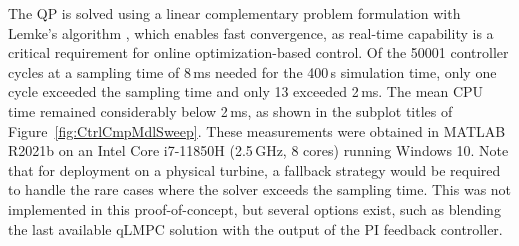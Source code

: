  The QP is solved using a linear complementary problem formulation with Lemke's algorithm \cite{cisneros2020velocity}, which enables fast convergence, as real-time capability is a critical requirement for online optimization-based control. Of the 50001 controller cycles at a sampling time of 8\,ms needed for the 400\,s simulation time, only one cycle exceeded the sampling time and only 13 exceeded 2\,ms. The mean CPU time remained considerably below 2\,ms, as shown in the subplot titles of Figure~\ref{fig:CtrlCmpMdlSweep}. These measurements were obtained in MATLAB R2021b on an Intel Core i7-11850H (2.5\,GHz, 8 cores) running Windows 10. Note that for deployment on a physical turbine, a fallback strategy would be required to handle the rare cases where the solver exceeds the sampling time. This was not implemented in this proof-of-concept, but several options exist, such as blending the last available qLMPC solution with the output of the PI feedback controller.

